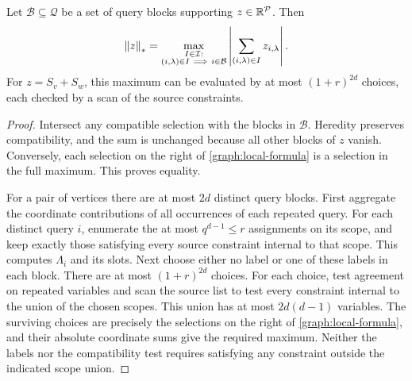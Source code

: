 \begin{lemma}\label{graph:local-norm}
Let $\mathcal B\subseteq\mathcal Q$ be a set of query blocks
supporting $z\in\mathbb R^{\mathcal P}$.  Then
\begin{equation}\label{graph:local-formula}
 \norm{z}=\max_{\substack{I\in\mathcal I:\\
                          (i,\lambda)\in I\ \Longrightarrow\ i\in\mathcal B}}
       \left|\sum_{(i,\lambda)\in I}z_{i,\lambda}\right|.
\end{equation}
For $z=S_v+S_w$, this maximum can be evaluated by at most
$(1+r)^{2d}$ choices, each checked by a scan of the source constraints.
\end{lemma}
\begin{proof}
Intersect any compatible selection with the blocks in $\mathcal B$.
Heredity preserves compatibility, and the sum is unchanged because
all other blocks of $z$ vanish.  Conversely, each selection on the
right of \eqref{graph:local-formula} is a selection in the full
maximum.  This proves equality.

For a pair of vertices there are at most $2d$ distinct query blocks.
First aggregate the coordinate contributions of all occurrences of
each repeated query.  For each distinct query $i$, enumerate the at
most $q^{d-1}\leq r$ assignments on its scope, and keep exactly those
satisfying every source constraint internal to that scope.  This
computes $\Lambda_i$ and its slots.  Next choose either no label or
one of these labels in each block.  There are at most $(1+r)^{2d}$
choices.  For each choice, test agreement on repeated variables and
scan the source list to test every constraint internal to the union
of the chosen scopes.  This union has at most $2d(d-1)$ variables.
The surviving choices are precisely the selections on the right of
\eqref{graph:local-formula}, and their absolute coordinate sums give
the required maximum.  Neither the labels nor the compatibility test
requires satisfying any constraint outside the indicated scope union.
\end{proof}

